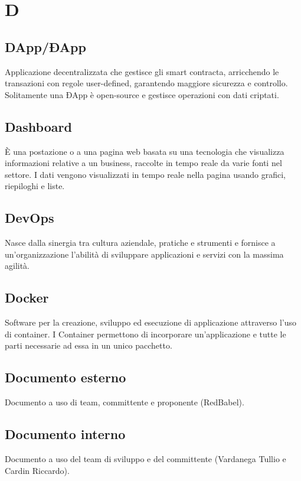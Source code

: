 \section*{D}
\subsection*{DApp/ÐApp}
Applicazione decentralizzata che gestisce gli smart contracta\glo, arricchendo le transazioni con regole user-defined, garantendo maggiore sicurezza e controllo. Solitamente una ÐApp è open-source e  gestisce operazioni con dati criptati.

\subsection*{Dashboard}
È una postazione o a una pagina web basata su una tecnologia che visualizza informazioni relative a un business, raccolte in tempo reale da varie fonti nel settore. I dati vengono visualizzati in tempo reale nella pagina usando grafici, riepiloghi e liste.

\subsection*{DevOps}
Nasce dalla sinergia tra cultura aziendale, pratiche e strumenti e fornisce a un'organizzazione l'abilità di sviluppare applicazioni e servizi con la massima agilità.

\subsection*{Docker}
Software per la creazione, sviluppo ed esecuzione di applicazione attraverso l’uso di container. I Container
permettono di incorporare un’applicazione e tutte le parti necessarie ad essa in un unico pacchetto.

\subsection*{Documento esterno}
Documento a uso di team, committente e proponente (RedBabel).

\subsection*{Documento interno}
Documento a uso del team di sviluppo e del committente (Vardanega Tullio e Cardin Riccardo).

